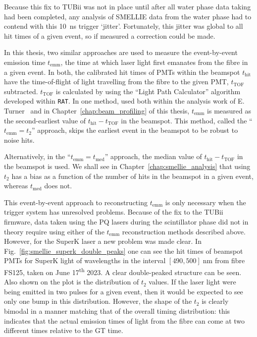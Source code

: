 Because this fix to TUBii was not in place until after all water phase data taking had been completed, any analysis of SMELLIE data from the water phase had to contend with this \SI{10}{\ns} trigger `jitter'. Fortunately, this jitter was global to all hit times of a given event, so if measured a correction could be made.

In this thesis, two similar approaches are used to measure the event-by-event emission time $t_{\mathrm{emm}}$, the time at which laser light first emanates from the fibre in a given event. In both, the calibrated hit times of PMTs within the beamspot $t_{\mathrm{hit}}$ have the time-of-flight of light travelling from the fibre to the given PMT, $t_{\mathrm{TOF}}$ subtracted. $t_{\mathrm{TOF}}$ is calculated by using the ``Light Path Calculator'' algorithm developed within \texttt{RAT}. In one method, used both within the analysis work of E. Turner~\cite{turnerMeasurementScatteringCharacteristics2022} %
and in Chapter~\ref{chap:beam_profiling} of this thesis, $t_{\mathrm{emm}}$ is measured as the second-earliest value of $t_{\mathrm{hit}}-t_{\mathrm{TOF}}$ in the beamspot. This method, called the ``$t_{\mathrm{emm}} = t_{2}$'' approach, skips the earliest event in the beamspot to be robust to noise hits.

Alternatively, in the ``$t_{\mathrm{emm}} = t_{\mathrm{med}}$'' approach, the median value of $t_{\mathrm{hit}}-t_{\mathrm{TOF}}$ in the beamspot is used. We shall see in Chapter~\ref{chap:smellie_analysis} that using $t_{2}$ has a bias as a function of the number of hits in the beamspot in a given event, whereas $t_{\mathrm{med}}$ does not.

This event-by-event approach to reconstructing $t_{\mathrm{emm}}$ is only necessary when the trigger system has unresolved problems. Because of the fix to the TUBii firmware, data taken using the PQ lasers during the scintillator phase did not in theory require using either of the $t_{\mathrm{emm}}$ reconstruction methods described above. However, for the SuperK laser a new problem was made clear. In Fig.~\ref{fig:smellie_superk_double_peaks} one can see the hit times of beamspot PMTs for SuperK light of wavelengths in the interval $[490,500]\;\si{\nm}$ from fibre FS125, taken on June 17\textsuperscript{th} 2023. %
A clear double-peaked structure can be seen. Also shown on the plot is the distribution of $t_{2}$ values. If the laser light were being emitted in two pulses for a given event, then it would be expected to see only one bump in this distribution. However, the shape of the $t_{2}$ is clearly bimodal in a manner matching that of the overall timing distribution: this indicates that the actual emission times of light from the fibre can come at two different times relative to the GT time.


